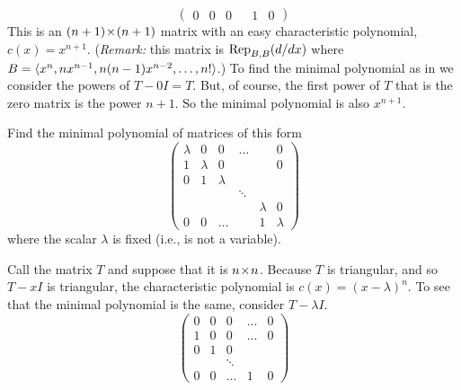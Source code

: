 \begin{exercises}
\begin{answer}
\begin{equation*}
\begin{pmatrix}
           0  &0  &0  &       &1 &0 
         \end{pmatrix}
       \end{equation*}
       This is an $\nbyn{(n+1)}$ matrix with an easy 
       characteristic polynomial,
       $c(x)=x^{n+1}$.
       (\textit{Remark:} this matrix is $\rep{d/dx}{B,B}$ where
        $B=\sequence{x^n,nx^{n-1},n(n-1)x^{n-2},\ldots,n!}$.)
       To find the minimal polynomial as in 
       we consider the powers of $T-0I=T$.
       But, of course, the first power of $T$ that is the zero matrix is 
       the power $n+1$.
       So the minimal polynomial is also \( x^{n+1} \).
     \end{answer}
  \recommended \item 
    Find the minimal polynomial of matrices of this form
    \begin{equation*}
      \begin{pmatrix}
        \lambda  &0        &0          &\ldots  &        &0  \\
        1        &\lambda  &0          &        &        &0  \\
        0        &1        &\lambda                          \\
                 &         &           &\ddots                \\
                 &         &           &        &\lambda &0   \\
        0        &0        &\ldots     &        &1       &\lambda
      \end{pmatrix}
    \end{equation*}
    where the scalar $\lambda$ is fixed (i.e., is not a variable).
    \begin{answer}
      Call the matrix $T$ and suppose that it is \( \nbyn{n} \).
      Because $T$ is triangular, and so $T-xI$ is triangular,
      the characteristic polynomial is $c(x)=(x-\lambda)^n$.
      To see that the minimal polynomial is the same, consider
      $T-\lambda I$.
      \begin{equation*}
        \begin{pmatrix}
          0        &0        &0          &\ldots  &0  \\
          1        &0        &0          &\ldots  &0  \\
          0        &1        &0                       \\
                   &         &\ddots                  \\
          0        &0        &\ldots     &1       &0      

\end{pmatrix}
\end{equation*}
\end{answer}
\end{exercises}
